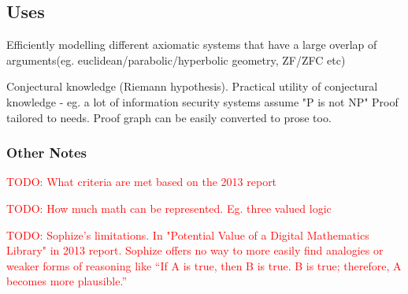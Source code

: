 \documentclass[a4paper]{article}
\newcommand\todo[1]{\textcolor{red}{TODO: #1}}
\begin{document}
\subsection{Uses}
Efficiently modelling different axiomatic systems that have a large overlap of arguments(eg. euclidean/parabolic/hyperbolic geometry, ZF/ZFC etc)

Conjectural knowledge (Riemann hypothesis). 
Practical utility of conjectural knowledge - eg. a lot of information security systems assume "P is not NP"
Proof tailored to needs. Proof graph can be easily converted to prose too.


\subsubsection{Other Notes}
\todo{What criteria are met based on the 2013 report}

\todo{How much math can be represented. Eg. three valued logic}

\todo{Sophize's limitations. In "Potential Value of a
Digital Mathematics Library" in 2013 report. Sophize offers no way to more easily find analogies or weaker forms of reasoning like “If A is true, then B is true. B is true; therefore, A becomes more plausible.” }

 


\end{document}
